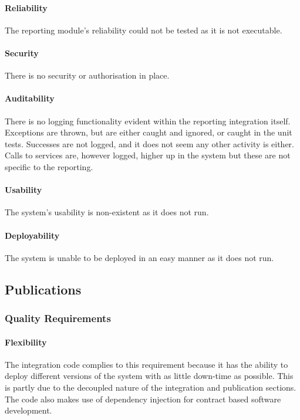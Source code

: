 \documentclass{article}
\begin{document}
        	\paragraph{Reliability}
            The reporting module's reliability could not be tested as it is not executable.
            \paragraph{Security}
            There is no security or authorisation in place.
            \paragraph{Auditability}
            There is no logging functionality evident within the reporting integration itself. Exceptions are thrown, but are either caught and ignored, or caught in the unit tests. Successes are not logged, and it does not seem any other activity is either. Calls to services are, however logged, higher up in the system but these are not specific to the reporting.
			\paragraph{Usability} The system's usability is non-existent as it does not run.
			\paragraph{Deployability} The system is unable to be deployed in an easy manner as it does not run.    

    \subsection{Publications}
    	\subsubsection{Quality Requirements}
    		\paragraph{Flexibility}
            The integration code complies to this requirement because it has the ability to deploy different versions of the system with as little down-time as possible. This is partly due to the decoupled nature of the integration and publication sections. The code also makes use of dependency injection for contract based software development.
    
\end{document}
